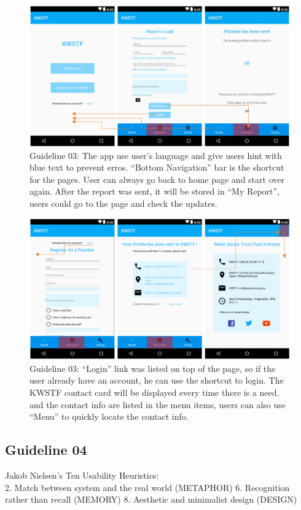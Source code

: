 \documentclass{article}
\begin{document}
\begin{figure}[H]
\centering
\includegraphics[width=15cm]{files/figures/fig1_guide3.png}
\caption{Guideline 03: The app use user’s language and give users hint with blue text to prevent erros. “Bottom Navigation” bar is the shortcut for the
pages. User can always go back to home page and start over again. After the report was sent, it will be stored in “My Report”,
users could go to the page and check the updates.}
\end{figure}

\begin{figure}[H]
\centering
\includegraphics[width=15cm]{files/figures/fig2_guide3.png}
\caption{Guideline 03: “Login” link was listed on top of the page, so if the user already have an account, he can use the shortcut to login. The
KWSTF contact card will be displayed every time there is a need, and the contact info are listed in the menu items, users
can also use “Menu” to quickly locate the contact info.}

\end{figure} 

\subsection{Guideline 04}
Jakob Nielsen’s Ten Usability Heuristics:\\
2. Match between system and the real world (METAPHOR) 6. Recognition rather than recall (MEMORY) 8. Aesthetic and minimalist design (DESIGN)
\end{document}
